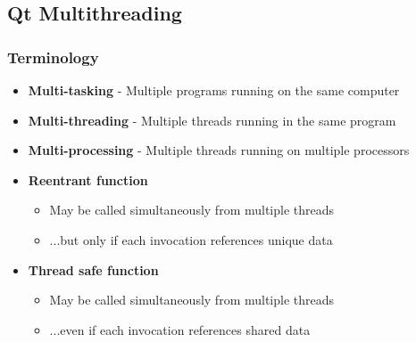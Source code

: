 %
%
%
%

\subsection{Qt Multithreading}


\begin{slide}
\frametitle{Terminology}

\begin{itemize}
\item \textbf{Multi-tasking} - Multiple programs running on the same computer
\item \textbf{Multi-threading} - Multiple threads running in the same program
\item \textbf{Multi-processing} - Multiple threads running on multiple processors
\vspace{1em}
\item \textbf{Reentrant function}
  \begin{itemize}
  \item May be called simultaneously from multiple threads
  \item ...but only if each invocation references unique data
  \end{itemize}
\item \textbf{Thread safe function}
  \begin{itemize}
  \item May be called simultaneously from multiple threads
  \item ...even if each invocation references shared data
  \end{itemize}
\end{itemize}

\end{slide}


